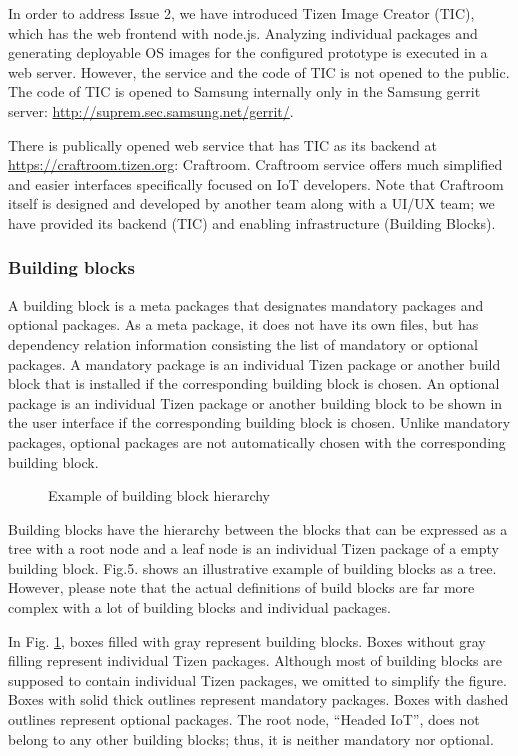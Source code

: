 In order to address Issue 2, we have introduced Tizen Image Creator (TIC), which has the web frontend with node.js. Analyzing individual packages and generating deployable OS images for the configured prototype is executed in a web server. However, the service and the code of TIC is not opened to the public. The code of TIC is opened to Samsung internally only in the Samsung gerrit server: \url{http://suprem.sec.samsung.net/gerrit/}.


There is publically opened web service that has TIC as its backend at \url{https://craftroom.tizen.org}: Craftroom. Craftroom service offers much simplified and easier interfaces specifically focused on IoT developers. Note that Craftroom itself is designed and developed by another team along with a UI/UX team; we have provided its backend (TIC) and enabling infrastructure (Building Blocks).


\subsubsection{Building blocks}

A building block is a meta packages that designates mandatory packages and optional packages. As a meta package, it does not have its own files, but has dependency relation information consisting the list of mandatory or optional packages. A mandatory package is an individual Tizen package or another build block that is installed if the corresponding building block is chosen. An optional package is an individual Tizen package or another building block to be shown in the user interface if the corresponding building block is chosen. Unlike mandatory packages, optional packages are not automatically chosen with the corresponding building block.


\begin{figure}
\label{FIG_TZN_BBHier}
\caption{Example of building block hierarchy}
\end{figure}

Building blocks have the hierarchy between the blocks that can be expressed as a tree with a root node and a leaf node is an individual Tizen package of a empty building block. Fig.5. shows an illustrative example of building blocks as a tree. However, please note that the actual definitions of build blocks are far more complex with a lot of building blocks and individual packages.


In Fig. \ref{FIG_TZN_BBHier}, boxes filled with gray represent building blocks. Boxes without gray filling represent individual Tizen packages. Although most of building blocks are supposed to contain individual Tizen packages, we omitted to simplify the figure. Boxes with solid thick outlines represent mandatory packages. Boxes with dashed outlines represent optional packages. The root node, “Headed IoT”, does not belong to any other building blocks; thus, it is neither mandatory nor optional. 



